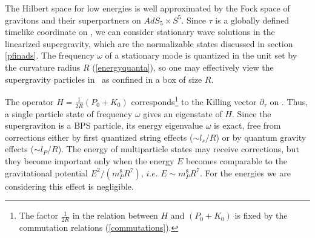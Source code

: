 The Hilbert space for low energies is well approximated by the
Fock space of gravitons and their superpartners on $AdS_5\times S^5$.
Since $\tau$ is a globally defined timelike coordinate on \ads ,
we can consider stationary wave solutions in the linearized
supergravity, which are the normalizable states discussed in section
\ref{pfinads}. The frequency $\omega$ of a stationary mode is quantized
in the unit set by the curvature radius $R$ (\ref{energyquanta}),
so  one may effectively view the supergravity particles
in \ads\ as confined in a box of size $R$. 

The operator $H=\frac{1}{2R}(P_0 + K_0)$ 
corresponds\footnote{
The factor $\frac{1}{2R}$ in the relation between $H$ and
$(P_0+K_0)$ is fixed by
the commutation relations (\ref{commutations}).}  to
the Killing vector $\partial_\tau$ on \ads.
Thus, a single particle state of frequency $\omega$
gives an eigenstate of $H$.
Since the supergraviton is a BPS particle, 
its energy eigenvalue $\omega$ 
is exact, free from corrections 
either by first quantized string effects ($\sim l_s/R$) 
or by quantum gravity effects 
($\sim l_P/R$). The energy of multiparticle states
may receive corrections, but they become important only
when the energy $E$ becomes comparable to the gravitational
potential $E^2/(m_P^8 R^7)$, $i.e.$ $E \sim m_P^8 R^7$.
For the energies we are considering  this effect is negligible. 

